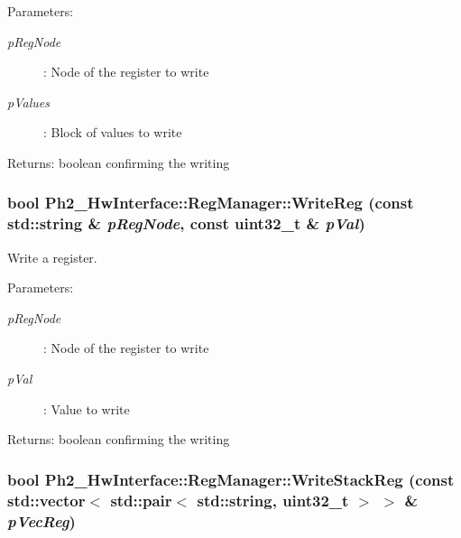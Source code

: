 \begin{Desc}
\item[Parameters:]
\begin{description}
\item[{\em p\-Reg\-Node}]: Node of the register to write \item[{\em p\-Values}]: Block of values to write \end{description}
\end{Desc}
\begin{Desc}
\item[Returns:]boolean confirming the writing \end{Desc}
\hypertarget{class_ph2___hw_interface_1_1_reg_manager_31174516fef6706c88c3f59dd93e4fdf}{
\subsubsection[WriteReg]{\setlength{\rightskip}{0pt plus 5cm}bool Ph2\_\-Hw\-Interface::Reg\-Manager::Write\-Reg (const std::string \& {\em p\-Reg\-Node}, const uint32\_\-t \& {\em p\-Val})}}
\label{class_ph2___hw_interface_1_1_reg_manager_31174516fef6706c88c3f59dd93e4fdf}


Write a register. 

\begin{Desc}
\item[Parameters:]
\begin{description}
\item[{\em p\-Reg\-Node}]: Node of the register to write \item[{\em p\-Val}]: Value to write \end{description}
\end{Desc}
\begin{Desc}
\item[Returns:]boolean confirming the writing \end{Desc}
\hypertarget{class_ph2___hw_interface_1_1_reg_manager_be0d1107ea6f4804b2ddc92509f181d6}{
\subsubsection[WriteStackReg]{\setlength{\rightskip}{0pt plus 5cm}bool Ph2\_\-Hw\-Interface::Reg\-Manager::Write\-Stack\-Reg (const std::vector$<$ std::pair$<$ std::string, uint32\_\-t $>$ $>$ \& {\em p\-Vec\-Reg})}}
\label{class_ph2___hw_interface_1_1_reg_manager_be0d1107ea6f4804b2ddc92509f181d6}


